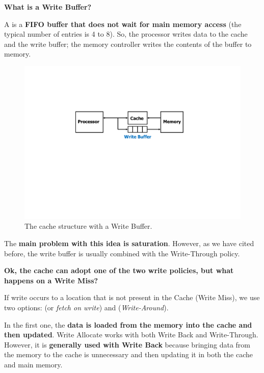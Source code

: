 \begin{flushleft}
    \textcolor{Red2}{ \textbf{What is a Write Buffer?}}
\end{flushleft}

\noindent
A  is a \textbf{FIFO buffer that does not wait for main memory access} (the typical number of entries is 4 to 8). So, the processor writes data to the cache and the write buffer; the memory controller writes the contents of the buffer to memory.

\begin{figure}[!htp]
    \centering
    \includegraphics[width=.8\textwidth]{img/write-buffer-1.pdf}
    \caption{The cache structure with a Write Buffer.}
\end{figure}

\noindent
The \textbf{main problem with this idea is saturation}. However, as we have cited before, the write buffer is usually combined with the Write-Through policy.

\newpage

\begin{flushleft}
    \textcolor{Red2}{ \textbf{Ok, the cache can adopt one of the two write policies, but what happens on a Write Miss?}}
\end{flushleft}

\noindent
If write occurs to a location that is not present in the Cache (Write Miss), we use two options:  (or \emph{fetch on write}) and  (\emph{Write-Around}).

\highspace
In the first one, the \textbf{data is loaded from the memory into the cache and then updated}. Write Allocate works with both Write Back and Write-Through. However, it is \textbf{generally used with Write Back} because bringing data from the memory to the cache is unnecessary and then updating it in both the cache and main memory.

